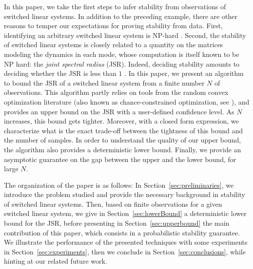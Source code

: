 In this paper, we take the first steps to infer stability from observations of switched linear systems. In addition to the preceding example, there are other reasons to temper our expectations for proving stability from data. First,  identifying an arbitrary switched linear system is NP-hard \cite{jungers_lncis}. Second, the stability of switched linear systems is closely related to a quantity on the matrices modeling the dynamics in each mode, whose computation is itself known to be NP hard: the \emph{joint spectral radius} (JSR). Indeed, deciding stability amounts to deciding whether the JSR is less than $1$ \cite{jungers_lncis}. In this paper, we present an algorithm to bound the JSR of a switched linear system from a finite number $N$ of observations. This algorithm partly relies on tools from the random convex optimization literature (also known as chance-constrained optimization, see \cite{campi,nemirovski,campi-garatti}), and provides an upper bound on the JSR with a user-defined confidence level. As $N$ increases, this bound gets tighter. Moreover, with a closed form expression, we characterize what is the exact trade-off between the tightness of this bound and the number of samples. In order to understand the quality of our upper bound, the algorithm also provides a deterministic lower bound. Finally, we provide an asymptotic guarantee on the gap between the upper and the lower bound, for large $N$.


The organization of the paper is as follows: In Section~\ref{sec:preliminaries}, we introduce the problem studied and provide the necessary background in stability of switched linear systems. Then, based on finite observations for a given switched linear system, we give in Section~\ref{sec:lowerBound} a deterministic lower bound for the JSR, before presenting in Section~\ref{sec:upperbound} the main contribution of this paper, which consists in a probabilistic stability guarantee. We illustrate the performance of the presented techniques with some experiments in Section~\ref{sec:experiments}, then we conclude in Section~\ref{sec:conclusions}, while hinting at our related future work.

